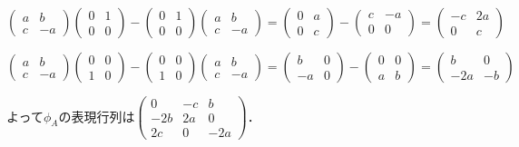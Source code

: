\documentclass[
		book,
		head_space=20mm,
		foot_space=20mm,
		gutter=10mm,
		line_length=190mm
]{jlreq}
\begin{document}
$\begin{pmatrix}
    a & b \\
    c & -a
\end{pmatrix}\begin{pmatrix}
    0 & 1 \\
    0 & 0
\end{pmatrix}-\begin{pmatrix}
    0 & 1 \\
    0 & 0
\end{pmatrix}\begin{pmatrix}
    a & b \\
    c & -a
\end{pmatrix}=\begin{pmatrix}
    0 & a \\
    0 & c
\end{pmatrix}-\begin{pmatrix}
    c & -a \\
    0 & 0 
\end{pmatrix}= \begin{pmatrix}
    -c & 2a \\
    0 & c
\end{pmatrix}$

$\begin{pmatrix}
    a & b \\
    c & -a
\end{pmatrix}\begin{pmatrix}
    0 & 0 \\
    1 & 0
\end{pmatrix}-\begin{pmatrix}
    0 & 0 \\
    1 & 0
\end{pmatrix}\begin{pmatrix}
    a & b \\
    c & -a
\end{pmatrix}=\begin{pmatrix}
    b & 0 \\
    -a & 0
\end{pmatrix}-\begin{pmatrix}
    0 & 0 \\
    a & b
\end{pmatrix}= \begin{pmatrix}
    b & 0 \\
    -2a & -b
\end{pmatrix}$

よって$\phi_A$の表現行列は$\begin{pmatrix}
    0 & -c & b \\
    -2b & 2a & 0 \\
    2c & 0 & -2a
\end{pmatrix}$．
\end{document}
